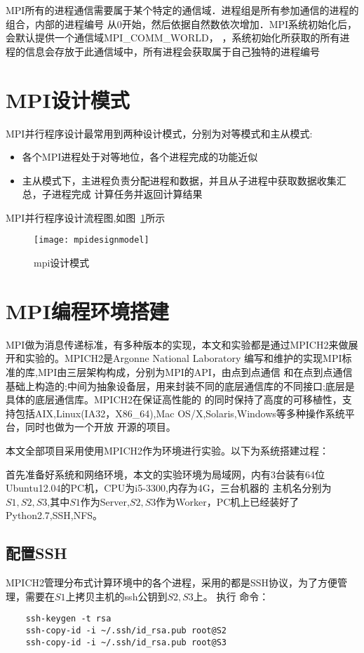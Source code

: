     MPI所有的进程通信需要属于某个特定的通信域．进程组是所有参加通信的进程的组合，内部的进程编号
从0开始，然后依据自然数依次增加．MPI系统初始化后，会默认提供一个通信域MPI\_COMM\_WORLD，
，系统初始化所获取的所有进程的信息会存放于此通信域中，所有进程会获取属于自己独特的进程编号


\section{MPI设计模式}
    MPI并行程序设计最常用到两种设计模式，分别为对等模式和主从模式:
    \begin{itemize}
    \item 各个MPI进程处于对等地位，各个进程完成的功能近似
    \item 主从模式下，主进程负责分配进程和数据，并且从子进程中获取数据收集汇总，子进程完成
计算任务并返回计算结果
    \end{itemize}
    
    MPI并行程序设计流程图,如图~\ref{fig:mpidesignmodel}所示

    \begin{figure}[htbp]
    \centering
    \texttt{[image: mpidesignmodel]}
    \caption{mpi设计模式}\label{fig:mpidesignmodel}
    \vspace{\baselineskip}
    \end{figure}

\section{MPI编程环境搭建}
     MPI做为消息传递标准，有多种版本的实现，本文和实验都是通过MPICH2来做展开和实验的。MPICH2是Argonne National Laboratory
编写和维护的实现MPI标准的库,MPI由三层架构构成，分别为MPI的API，由点到点通信
和在点到点通信基础上构造的;中间为抽象设备层，用来封装不同的底层通信库的不同接口;底层是具体的底层通信库。MPICH2在保证高性能的
的同时保持了高度的可移植性，支持包括AIX,Linux(IA32，X86\_64),Mac OS/X,Solaris,Windows等多种操作系统平台，同时也做为一个开放
开源的项目。

    本文全部项目采用使用MPICH2作为环境进行实验。以下为系统搭建过程：

    首先准备好系统和网络环境，本文的实验环境为局域网，内有3台装有64位Ubuntu12.04的PC机，CPU为i5-3300,内存为4G，三台机器的
主机名分别为$S1,S2,S3$,其中$S1$作为Server,$S2,S3$作为Worker，PC机上已经装好了Python2.7,SSH,NFS。

\subsection{配置SSH}    
    MPICH2管理分布式计算环境中的各个进程，采用的都是SSH协议，为了方便管理，需要在$S1$上拷贝主机的ssh公钥到$S2,S3$上。 执行
命令：
    \begin{verbatim}
    ssh-keygen -t rsa
    ssh-copy-id -i ~/.ssh/id_rsa.pub root@S2
    ssh-copy-id -i ~/.ssh/id_rsa.pub root@S3
    \end{verbatim}
